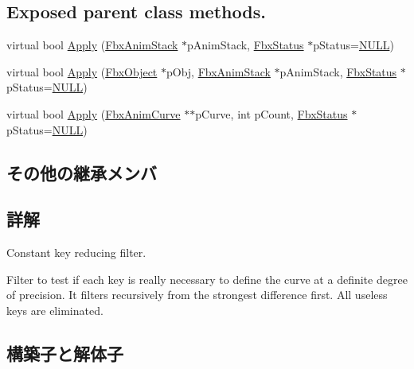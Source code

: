 \subsection*{Exposed parent class methods.}
\begin{DoxyCompactItemize}
\item 
virtual bool \hyperlink{class_fbx_anim_curve_filter_constant_key_reducer_a723169c1dc3a2d9557eb03908055c277}{Apply} (\hyperlink{class_fbx_anim_stack}{Fbx\+Anim\+Stack} $\ast$p\+Anim\+Stack, \hyperlink{class_fbx_status}{Fbx\+Status} $\ast$p\+Status=\hyperlink{fbxarch_8h_a070d2ce7b6bb7e5c05602aa8c308d0c4}{N\+U\+LL})
\item 
virtual bool \hyperlink{class_fbx_anim_curve_filter_constant_key_reducer_a08bf131629e3e1bc798a342cd479c2e4}{Apply} (\hyperlink{class_fbx_object}{Fbx\+Object} $\ast$p\+Obj, \hyperlink{class_fbx_anim_stack}{Fbx\+Anim\+Stack} $\ast$p\+Anim\+Stack, \hyperlink{class_fbx_status}{Fbx\+Status} $\ast$p\+Status=\hyperlink{fbxarch_8h_a070d2ce7b6bb7e5c05602aa8c308d0c4}{N\+U\+LL})
\item 
virtual bool \hyperlink{class_fbx_anim_curve_filter_constant_key_reducer_aea1789418ec3f29dba7805f2782e843c}{Apply} (\hyperlink{class_fbx_anim_curve}{Fbx\+Anim\+Curve} $\ast$$\ast$p\+Curve, int p\+Count, \hyperlink{class_fbx_status}{Fbx\+Status} $\ast$p\+Status=\hyperlink{fbxarch_8h_a070d2ce7b6bb7e5c05602aa8c308d0c4}{N\+U\+LL})
\end{DoxyCompactItemize}
\subsection*{その他の継承メンバ}


\subsection{詳解}
Constant key reducing filter.

Filter to test if each key is really necessary to define the curve at a definite degree of precision. It filters recursively from the strongest difference first. All useless keys are eliminated. 

\subsection{構築子と解体子}
\mbox{\label{class_fbx_anim_curve_filter_constant_key_reducer_a5baf6160f4bf332b9235e0d1abb1aa3a}} 
